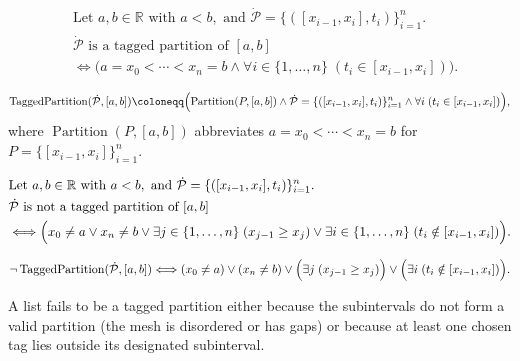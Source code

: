 \begin{remark*}
\[
\begin{aligned}
&\text{Let } a,b \in \mathbb{R} \text{ with } a<b, \text{ and } \dot{\mathcal{P}}=\{([x_{i-1},x_i],t_i)\}_{i=1}^n.\\
&\dot{\mathcal{P}} \text{ is a tagged partition of } [a,b]\\
&\Longleftrightarrow \bigl(a=x_0<\cdots<x_n=b \land \forall i \in \{1,\ldots,n\}\;(t_i \in [x_{i-1},x_i])\bigr).
\end{aligned}
\]
\end{remark*}

\begin{remark*}
\[
\operatorname{TaggedPartition}(\dot{\mathcal{P}},[a,b])
\coloneqq
\Bigl(\operatorname{Partition}(P,[a,b]) \land \dot{\mathcal{P}}=\{([x_{i-1},x_i],t_i)\}_{i=1}^n \land \forall i\;(t_i \in [x_{i-1},x_i])\Bigr),
\]
where $\operatorname{Partition}(P,[a,b])$ abbreviates $a=x_0<\cdots<x_n=b$ for $P=\{[x_{i-1},x_i]\}_{i=1}^n$.
\end{remark*}

\begin{remark*}
\[
\begin{aligned}
&\text{Let } a,b \in \mathbb{R} \text{ with } a<b, \text{ and } \dot{\mathcal{P}}=\{([x_{i-1},x_i],t_i)\}_{i=1}^n.\\
&\dot{\mathcal{P}} \text{ is not a tagged partition of } [a,b]\\
&\Longleftrightarrow
\Bigl(x_0\ne a \lor x_n\ne b \lor
\exists j \in \{1,\ldots,n\}\;(x_{j-1} \ge x_j) \lor
\exists i \in \{1,\ldots,n\}\;(t_i \notin [x_{i-1},x_i])\Bigr).
\end{aligned}
\]
\end{remark*}

\begin{remark*}
\[
\neg\operatorname{TaggedPartition}(\dot{\mathcal{P}},[a,b])
\Longleftrightarrow
(x_0\ne a)\lor(x_n\ne b)\lor
\Bigl(\exists j\;(x_{j-1} \ge x_j)\Bigr) \lor \Bigl(\exists i\;(t_i \notin [x_{i-1},x_i])\Bigr).
\]
\end{remark*}

\begin{remark*}
A list fails to be a tagged partition either because the subintervals do not form a valid partition (the mesh is disordered or has gaps) or because at least one chosen tag lies outside its designated subinterval.
\end{remark*}

